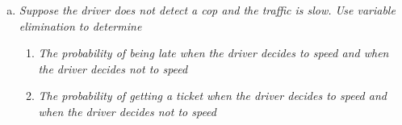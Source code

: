 \documentclass{article}
\begin{document}
\begin{enumerate}[(a)]
\item \textit{Suppose the driver does not detect a cop and the traffic is slow. 
  Use variable elimination to determine}


  \begin{enumerate}
  \item \textit{The probability of being late when the driver decides to speed 
    and when the driver decides not to speed}


 

  \item \textit{The probability of getting a ticket when the driver decides to 
    speed and when the driver decides not to speed}



\end{enumerate}
\end{enumerate}
\end{document}
